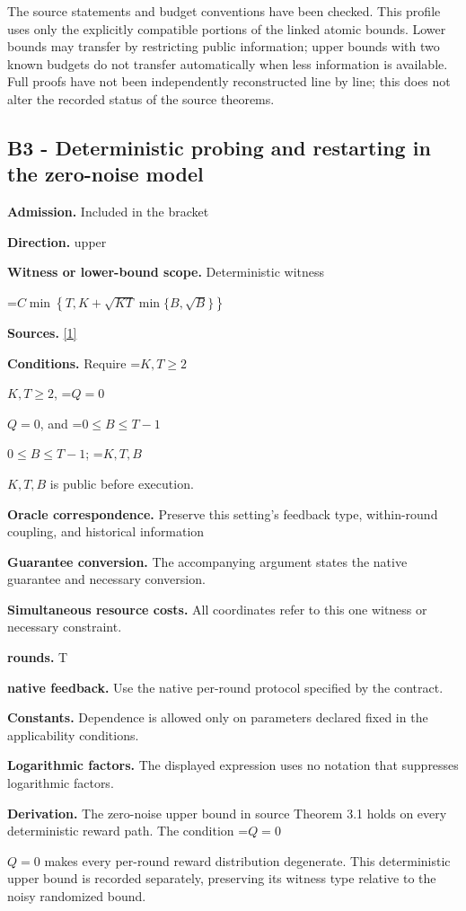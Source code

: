 \documentclass[10pt,a4paper]{article}
\newcommand{\AtlasMath}[1]{\par\begingroup\centering\setbox0=\hbox{$\displaystyle #1$}\ifdim\wd0>1.4\linewidth\typeout{ATLAS WIDE FORMULA: \the\wd0}\fi\ifdim\wd0>\linewidth\resizebox{\linewidth}{!}{\box0}\else\box0\fi\par\endgroup}
\newcommand{\AtlasInlineMath}[1]{\begingroup\setbox0=\hbox{$#1$}\ifdim\wd0>.4\linewidth\endgroup\AtlasMath{#1}\else\endgroup$#1$\fi}
\begin{document}
The source statements and budget conventions have been checked. This profile uses only the explicitly compatible portions of the linked atomic bounds. Lower bounds may transfer by restricting public information; upper bounds with two known budgets do not transfer automatically when less information is available. Full proofs have not been independently reconstructed line by line; this does not alter the recorded status of the source theorems.

\subsection{B3 - Deterministic probing and restarting in the zero-noise model}
\textbf{Admission.} Included in the bracket

\textbf{Direction.} upper

\textbf{Witness or lower-bound scope.} Deterministic witness

\AtlasMath{C\min\!\left\{T,K+\sqrt{KT}\min\{B,\sqrt B\}\right\}}
\textbf{Sources.} \href{https://arxiv.org/pdf/2610.26116}{[1]}

\textbf{Conditions.} Require \AtlasInlineMath{K,T\ge2}, \AtlasInlineMath{Q=0}, and \AtlasInlineMath{0\le B\le T-1}; \AtlasInlineMath{K,T,B} is public before execution.

\textbf{Oracle correspondence.} Preserve this setting's feedback type, within-round coupling, and historical information

\textbf{Guarantee conversion.} The accompanying argument states the native guarantee and necessary conversion.

\textbf{Simultaneous resource costs.} All coordinates refer to this one witness or necessary constraint.

\textbf{rounds.} T

\textbf{native feedback.} Use the native per-round protocol specified by the contract.

\textbf{Constants.} Dependence is allowed only on parameters declared fixed in the applicability conditions.

\textbf{Logarithmic factors.} The displayed expression uses no notation that suppresses logarithmic factors.

\textbf{Derivation.} The zero-noise upper bound in source Theorem 3.1 holds on every deterministic reward path. The condition \AtlasInlineMath{Q=0} makes every per-round reward distribution degenerate. This deterministic upper bound is recorded separately, preserving its witness type relative to the noisy randomized bound.
\end{document}
